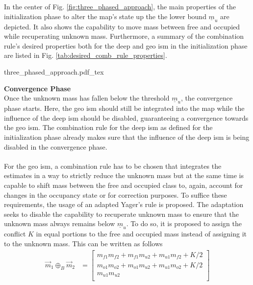 In the center of Fig. \ref{fig:three_phased_approach}, the main properties of the initialization phase to alter the map's state up the the lower bound $\underline{m}_{u}$ are depicted. It also shows the capability to move mass between free and occupied while recuperating unknown mass. Furthermore, a summary of the combination rule's desired properties both for the deep and geo \gls{ism} in the initialization phase are listed in Fig. \ref{tab:desired_comb_rule_properties}.
\begin{center}
	{three_phased_approach.pdf_tex}
\end{center}
\textbf{Convergence Phase}\\
Once the unknown mass has fallen below the threshold $\underline{m}_u$, the convergence phase starts. Here, the geo \gls{ism} should still be integrated into the map while the influence of the deep \gls{ism} should be disabled, guaranteeing a convergence towards the geo \gls{ism}. The combination rule for the deep \gls{ism} as defined for the initialization phase already makes sure that the influence of the deep \gls{ism} is being disabled in the convergence phase. 
\\\\
For the geo \gls{ism}, a combination rule has to be chosen that integrates the estimates in a way to strictly reduce the unknown mass but at the same time is capable to shift mass between the free and occupied class to, again, account for changes in the occupancy state or for correction purposes. To suffice these requirements, the usage of an adapted Yager's rule is proposed. The adaptation seeks to disable the capability to recuperate unknown mass to ensure that the unknown mass always remains below $\underline{m}_{u}$. To do so, it is proposed to assign the conflict $K$ in equal portions to the free and occupied mass instead of assigning it to the unknown mass. This can be written as follows
\begin{align}
	\label{eq:yaders_rule}
	\vec{m}_1 \oplus_B \vec{m}_2 &=  
	\begin{bmatrix} 
		m_{f1}m_{f2} + m_{f1}m_{u2} + m_{u1}m_{f2} + K/2\\
		m_{o1}m_{o2} + m_{o1}m_{u2} + m_{u1}m_{o2} + K/2\\
		m_{u1}m_{u2}\\
	\end{bmatrix}
\end{align}
